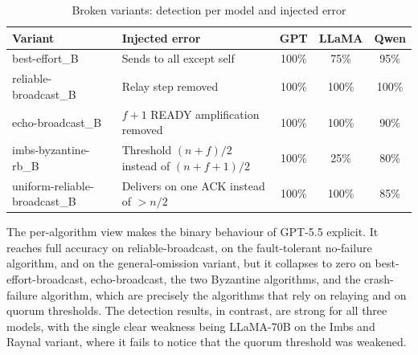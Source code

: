 \begin{table}[H]
\centering
\renewcommand{\arraystretch}{1.3}
\footnotesize
\caption{Broken variants: detection per model and injected error}
\label{tab:final-broken}
\begin{tabular}{|l|l|c|c|c|}
\hline
\textbf{Variant} & \textbf{Injected error} & \textbf{GPT} & \textbf{LLaMA} & \textbf{Qwen} \\
\hline
best-effort\_B & Sends to all except self & 100\% & 75\% & 95\% \\
reliable-broadcast\_B & Relay step removed & 100\% & 100\% & 100\% \\
echo-broadcast\_B & $f+1$ READY amplification removed & 100\% & 100\% & 90\% \\
imbs-byzantine-rb\_B & Threshold $(n+f)/2$ instead of $(n+f+1)/2$ & 100\% & 25\% & 80\% \\
uniform-reliable-broadcast\_B & Delivers on one ACK instead of $>n/2$ & 100\% & 100\% & 85\% \\
\hline
\end{tabular}
\end{table}

The per-algorithm view makes the binary behaviour of GPT-5.5 explicit. It reaches full accuracy on reliable-broadcast, on the fault-tolerant no-failure algorithm, and on the general-omission variant, but it collapses to zero on best-effort-broadcast, echo-broadcast, the two Byzantine algorithms, and the crash-failure algorithm, which are precisely the algorithms that rely on relaying and on quorum thresholds. The detection results, in contrast, are strong for all three models, with the single clear weakness being LLaMA-70B on the Imbs and Raynal variant, where it fails to notice that the quorum threshold was weakened.

